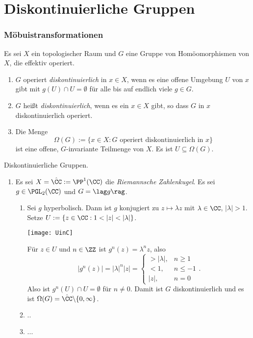 \part{Diskontinuierliche Gruppen}


\section{Möbuistransformationen}\label{sec_moebius}

\DB Es sei $X$ ein topologischer Raum und $G$ eine Gruppe von
Homöomorphismen von $X$, die effektiv operiert.
\begin{enumerate}
\item $G$ operiert \emph{diskontinuierlich}
in $x\in X$, wenn es
eine offene Umgebung $U$ von $x$ gibt mit $g(U)\cap U=\emptyset$
für alle bis auf endlich viele $g\in G$.
\item $G$ heißt \emph{diskontinuierlich},
wenn es ein $x\in X$ gibt, so dass $G$ in $x$ diskontinuierlich
operiert.
\item Die Menge
\[
\Omega(G) := \{x\in X : G \text{ operiert diskontinuierlich in } x \}
\]
ist eine offene, $G$-invariante Teilmenge von $X$.
Es ist $U\subseteq \Omega(G)$.
\end{enumerate}

\BSP Diskontinuierliche Gruppen.
\begin{enumerate}
\item Es sei $X=\hat{\CC}:=\PP^1(\CC)$ die
\emph{Riemannsche Zahlenkugel}.
Es sei $g\in\PGL_2(\CC)$ und $G=\lag g\rag$.
\begin{enumerate}
\item Sei $g$ hyperbolisch.
Dann ist $g$ konjugiert zu $z\mapsto \lambda z$ mit $\lambda\in\CC$,
$|\lambda|>1$.
Setze $U:=\{z\in\CC : 1<|z|<|\lambda| \}$.
\begin{center}
	\texttt{[image: UinC]}
\end{center}
Für $z\in U$ und $n\in\ZZ$ ist $g^n(z)=\lambda^n z$,
also
\[
|g^n(z)|=|\lambda|^n |z|=
\left\{
\begin{matrix}
>|\lambda|, & n\geq 1 \\
< 1, & n\leq -1 \\
|z|, & n=0
\end{matrix}
\right..
\]
Also ist $g^n(U)\cap U=\emptyset$ für $n\neq 0$.
Damit ist $G$ diskontinuierlich und es ist
$\Omega(G)=\hat{\CC}\backslash\{0,\infty\}$.
\item ..
\item ...
\end{enumerate}
\end{enumerate}